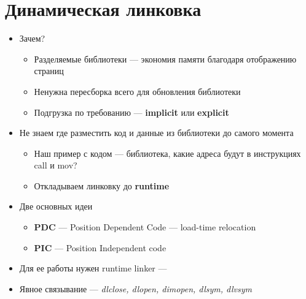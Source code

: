 \documentclass[../../lectures.tex]{subfiles}
\begin{document}
\section{Динамическая линковка}
\begin{itemize}
    \item Зачем?
        \begin{itemize}
            \item Разделяемые библиотеки --- экономия памяти благодаря отображению страниц
            \item Ненужна пересборка всего для обновления библиотеки
            \item Подгрузка по требованию --- \textbf{implicit} или \textbf{explicit}
        \end{itemize}
    \item Не знаем где разместить код и данные из библиотеки до самого момента
        \begin{itemize}
            \item Наш пример с кодом --- библиотека, какие адреса будут в инструкциях call и mov?
            \item Откладываем линковку до \textbf{runtime}
        \end{itemize}
    \item Две основных идеи
        \begin{itemize}
            \item \textbf{PDC} --- Position Dependent Code --- load-time relocation
            \item \textbf{PIC} --- Position Independent code
        \end{itemize}
    \item Для ее работы нужен runtime linker --- 
    \item Явное связывание --- \emph{dlclose, dlopen, dimopen, dlsym, dlvsym}
\end{itemize}
\end{document}
